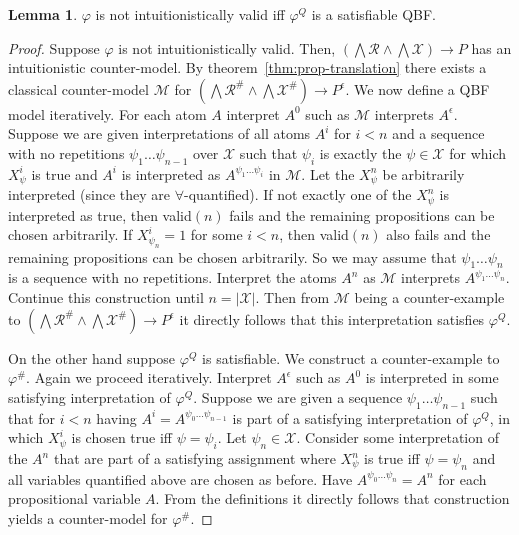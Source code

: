 \documentclass{easychair}
\theoremstyle{definition}
\theoremstyle{definition}
\theoremstyle{definition}
\newtheorem{lemma}[theorem]{Lemma}
\theoremstyle{definition}
\theoremstyle{definition}
\theoremstyle{definition}
\theoremstyle{definition}
\begin{document}
\begin{lemma}\label{lemma:QBF}
	$\varphi$ is not intuitionistically valid iff $\varphi^Q$ is a satisfiable QBF.
\end{lemma}
\begin{proof}
Suppose $\varphi$ is not intuitionistically valid.
Then, $(\bigwedge\mathcal R\wedge\bigwedge\mathcal X)\to P$ has an intuitionistic counter-model. By theorem~\ref{thm:prop-translation} there exists a classical counter-model $\mathcal M$ for $(\bigwedge\mathcal R^\#\wedge\bigwedge\mathcal X^\#)\to P^\epsilon$.
We now define a QBF model iteratively.
For each atom $A$ interpret $A^0$ such as $\mathcal M$ interprets $A^\epsilon$. Suppose we are given interpretations of all atoms $A^i$ for $i < n$ and a sequence with no repetitions $\psi_1\dots\psi_{n-1}$ over $\mathcal X$ such that $\psi_i$ is exactly the $\psi\in\mathcal X$ for which $X_{\psi}^i$ is true and $A^i$ is interpreted as $A^{\psi_1\dots\psi_i}$  in $\mathcal M$.
Let the $X^{n}_\psi$ be arbitrarily interpreted (since they are $\forall$-quantified). If not exactly one of the $X^{n}_\psi$ is interpreted as true, then valid$(n)$ fails and the remaining propositions can be chosen arbitrarily. If $X^i_{\psi_n} = 1$ for some $i < n$, then valid$(n)$ also fails and the remaining propositions can be chosen arbitrarily.
So we may assume that $\psi_1\dots\psi_n$ is a sequence with no repetitions.
Interpret the atoms $A^n$ as $\mathcal M$ interprets $A^{\psi_1\dots\psi_n}$.
Continue this construction until $n  = |\mathcal X|$. Then from $\mathcal M$ being a counter-example to $(\bigwedge\mathcal R^\#\wedge\bigwedge\mathcal X^\#)\to P^\epsilon$ it directly follows that this interpretation satisfies $\varphi^Q$.
	
On the other hand suppose $\varphi^Q$ is satisfiable. We construct a counter-example to $\varphi^\#$.
Again we proceed iteratively. Interpret $A^\epsilon$ such as $A^0$ is interpreted in some satisfying interpretation of $\varphi^Q$. Suppose we are given a sequence $\psi_1\dots \psi_{n-1}$ such that for $i<n$ having $A^i = A^{\psi_0\dots\psi_{n-1}}$ is part of a satisfying interpretation of $\varphi^Q$, in which $X^i_\psi$ is chosen true iff $\psi = \psi_i$. Let $\psi_n\in\mathcal X$. Consider some interpretation of the $A^n$ that are part of a satisfying assignment where $X^n_\psi$ is true iff $\psi = \psi_n$ and all variables quantified above are chosen as before. Have $A^{\psi_0\dots\psi_n} = A^n$ for each propositional variable $A$. From the definitions it directly follows that construction yields a counter-model for $\varphi^\#$.
\end{proof}
\end{document}
